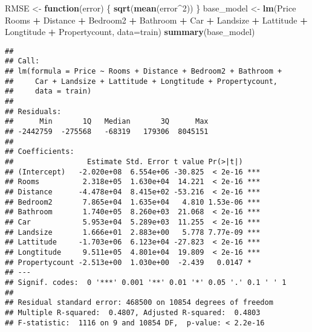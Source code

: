 \documentclass[]{article}
\newenvironment{Shaded}{\begin{snugshade}}{\end{snugshade}}
\newcommand{\ControlFlowTok}[1]{\textcolor[rgb]{0.13,0.29,0.53}{\textbf{#1}}}
\newcommand{\DataTypeTok}[1]{\textcolor[rgb]{0.13,0.29,0.53}{#1}}
\newcommand{\DecValTok}[1]{\textcolor[rgb]{0.00,0.00,0.81}{#1}}
\newcommand{\KeywordTok}[1]{\textcolor[rgb]{0.13,0.29,0.53}{\textbf{#1}}}
\newcommand{\NormalTok}[1]{#1}
\newcommand{\OperatorTok}[1]{\textcolor[rgb]{0.81,0.36,0.00}{\textbf{#1}}}
\newcommand{\StringTok}[1]{\textcolor[rgb]{0.31,0.60,0.02}{#1}}
\begin{document}
\begin{Shaded}
\begin{Highlighting}[]
\NormalTok{RMSE <-}\StringTok{ }\ControlFlowTok{function}\NormalTok{(error) \{ }\KeywordTok{sqrt}\NormalTok{(}\KeywordTok{mean}\NormalTok{(error}\OperatorTok{^}\DecValTok{2}\NormalTok{)) \}}
\NormalTok{base_model <-}\StringTok{ }\KeywordTok{lm}\NormalTok{(Price }\OperatorTok{~}\StringTok{ }\NormalTok{Rooms }\OperatorTok{+}\StringTok{ }\NormalTok{Distance }\OperatorTok{+}\StringTok{ }\NormalTok{Bedroom2 }\OperatorTok{+}\StringTok{ }\NormalTok{Bathroom }\OperatorTok{+}\StringTok{ }\NormalTok{Car }\OperatorTok{+}\StringTok{ }\NormalTok{Landsize }\OperatorTok{+}
\StringTok{              }\NormalTok{Lattitude }\OperatorTok{+}\StringTok{ }\NormalTok{Longtitude }\OperatorTok{+}\StringTok{ }\NormalTok{Propertycount, }\DataTypeTok{data=}\NormalTok{train)}
\KeywordTok{summary}\NormalTok{(base_model)}
\end{Highlighting}
\end{Shaded}

\begin{verbatim}
## 
## Call:
## lm(formula = Price ~ Rooms + Distance + Bedroom2 + Bathroom + 
##     Car + Landsize + Lattitude + Longtitude + Propertycount, 
##     data = train)
## 
## Residuals:
##      Min       1Q   Median       3Q      Max 
## -2442759  -275568   -68319   179306  8045151 
## 
## Coefficients:
##                 Estimate Std. Error t value Pr(>|t|)    
## (Intercept)   -2.020e+08  6.554e+06 -30.825  < 2e-16 ***
## Rooms          2.318e+05  1.630e+04  14.221  < 2e-16 ***
## Distance      -4.478e+04  8.415e+02 -53.216  < 2e-16 ***
## Bedroom2       7.865e+04  1.635e+04   4.810 1.53e-06 ***
## Bathroom       1.740e+05  8.260e+03  21.068  < 2e-16 ***
## Car            5.953e+04  5.289e+03  11.255  < 2e-16 ***
## Landsize       1.666e+01  2.883e+00   5.778 7.77e-09 ***
## Lattitude     -1.703e+06  6.123e+04 -27.823  < 2e-16 ***
## Longtitude     9.511e+05  4.801e+04  19.809  < 2e-16 ***
## Propertycount -2.513e+00  1.030e+00  -2.439   0.0147 *  
## ---
## Signif. codes:  0 '***' 0.001 '**' 0.01 '*' 0.05 '.' 0.1 ' ' 1
## 
## Residual standard error: 468500 on 10854 degrees of freedom
## Multiple R-squared:  0.4807, Adjusted R-squared:  0.4803 
## F-statistic:  1116 on 9 and 10854 DF,  p-value: < 2.2e-16
\end{verbatim}

\begin{Shaded}
\end{Shaded}
\end{document}
